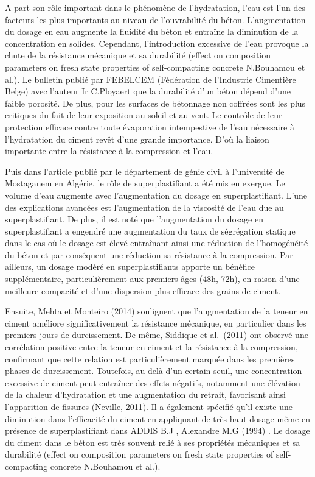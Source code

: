 \documentclass[
  12pt,
]{article}
\begin{document}
A part son rôle important dans le phénomène de l'hydratation, l'eau est
l'un des facteurs les plus importants au niveau de l'ouvrabilité du
béton. L'augmentation du dosage en eau augmente la fluidité du béton et
entraîne la diminution de la concentration en solides. Cependant,
l'introduction excessive de l'eau provoque la chute de la résistance
mécanique et sa durabilité (effect on composition parameters on fresh
state properties of self-compacting concrete N.Bouhamou et al.). Le
bulletin publié par FEBELCEM (Fédération de l'Industrie Cimentière
Belge) avec l'auteur Ir C.Ployaert que la durabilité d'un béton dépend
d'une faible porosité. De plus, pour les surfaces de bétonnage non
coffrées sont les plus critiques du fait de leur exposition au soleil et
au vent. Le contrôle de leur protection efficace contre toute
évaporation intempestive de l'eau nécessaire à l'hydratation du ciment
revêt d'une grande importance. D'où la liaison importante entre la
résistance à la compression et l'eau.

Puis dans l'article publié par le département de génie civil à
l'université de Mostaganem en Algérie, le rôle de superplastifiant a été
mis en exergue. Le volume d'eau augmente avec l'augmentation du dosage
en superplastifiant. L'une des explications avancées est l'augmentation
de la viscosité de l'eau due au superplastifiant. De plus, il est noté
que l'augmentation du dosage en superplastifiant a engendré une
augmentation du taux de ségrégation statique dans le cas où le dosage
est élevé entraînant ainsi une réduction de l'homogénéité du béton et
par conséquent une réduction sa résistance à la compression. Par
ailleurs, un dosage modéré en superplastifiants apporte un bénéfice
supplémentaire, particulièrement aux premiers âges (48h, 72h), en raison
d'une meilleure compacité et d'une dispersion plus efficace des grains
de ciment.

Ensuite, Mehta et Monteiro (2014) soulignent que l'augmentation de la
teneur en ciment améliore significativement la résistance mécanique, en
particulier dans les premiers jours de durcissement. De même, Siddique
et al.~(2011) ont observé une corrélation positive entre la teneur en
ciment et la résistance à la compression, confirmant que cette relation
est particulièrement marquée dans les premières phases de durcissement.
Toutefois, au-delà d'un certain seuil, une concentration excessive de
ciment peut entraîner des effets négatifs, notamment une élévation de la
chaleur d'hydratation et une augmentation du retrait, favorisant ainsi
l'apparition de fissures (Neville, 2011). Il a également spécifié qu'il
existe une diminution dans l'efficacité du ciment en appliquant de très
haut dosage même en présence de superplastifiant dans ADDIS B.J ,
Alexandre M.G (1994) . Le dosage du ciment dans le béton est très
souvent relié à ses propriétés mécaniques et sa durabilité (effect on
composition parameters on fresh state properties of self-compacting
concrete N.Bouhamou et al.).
\end{document}
